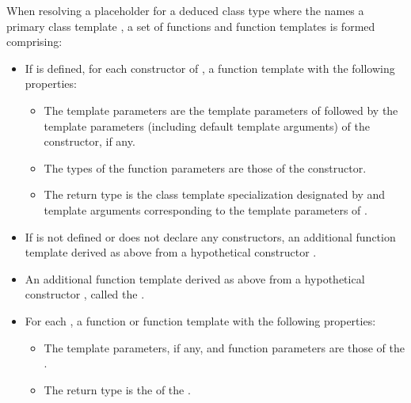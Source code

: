 \pnum
When resolving a placeholder for a deduced class type
where the  names a primary class template ,
a set of functions and function templates is formed comprising:
\begin{itemize}
\item
If  is defined,
for each constructor of ,
a function template with the following properties:
\begin{itemize}
\item
The template parameters are the template parameters of 
followed
by the template parameters (including default template arguments) of the constructor,
if any.
\item
The types of the function parameters are those of the constructor.
\item
The return type is the class template specialization
designated by 
and template arguments
corresponding to the template parameters of .
\end{itemize}

\item
If 
is not defined or does not declare any constructors,
an additional function template derived as above
from a hypothetical constructor .

\item
An additional function template derived as above
from a hypothetical constructor ,
called the .

\item
For each ,
a function or function template
with the following properties:

\begin{itemize}
\item
The template parameters, if any,
and function parameters
are those of the .
\item
The return type
is the 
of the .
\end{itemize}
\end{itemize}

